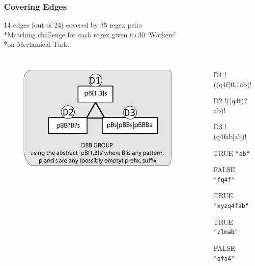 
\begin{frame}[fragile]
\frametitle{Covering Edges}
\begin{center}
14 edges (out of 24) covered by 35 regex pairs
\\*Matching challenge for each regex given to 30 `Workers'
\\*on Mechanical Turk.
\end{center}
\begin{columns}[t]
\begin{figure}
  \includegraphics[scale=0.35]{nontex/illustrations/DBBExample.eps}
  \label{fig:DBBExample}
\end{figure}
\begin{itemize}
\item[D1] \cverb!((q4f){0,1}ab)!
\item[D2] \cverb!((q4f)?ab)!
\item[D3] \cverb!(q4fab|ab)!
\item[TRUE] \verb|"ab"|
\item[FALSE] \verb|"fq4f"|
\item[TRUE] \verb|"xyzq4fab"|
\item[TRUE] \verb|"zlmab"|
\item[FALSE] \verb|"qfa4"|
\end{itemize}
\end{columns}
\end{frame}


